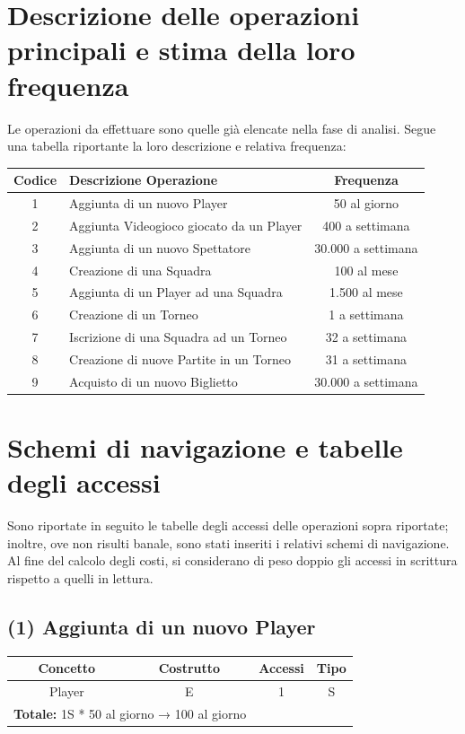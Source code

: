 \documentclass[a4paper,12pt]{report}
\begin{document}
\section{Descrizione delle operazioni principali e stima della loro frequenza}
Le operazioni da effettuare sono quelle già elencate nella fase di analisi. Segue una tabella
riportante la loro descrizione e relativa frequenza:
\begin{center}
	\begin{tabular}{|c|m{8cm}|c|}
		\hline\rowcolor{pink}
		Codice & Descrizione Operazione & Frequenza\\
		\hline\hline
		1 & Aggiunta di un nuovo Player & 50 al giorno\\ 
		\hline	
		2 & Aggiunta Videogioco giocato da un Player & 400 a settimana \\
		\hline
		3 & Aggiunta di un nuovo Spettatore & 30.000 a settimana \\
		\hline
		4 & Creazione di una Squadra & 100 al mese\\
		\hline 
		5 & Aggiunta di un Player ad una Squadra & 1.500 al mese\\ 
		\hline
		6 & Creazione di un Torneo & 1 a settimana\\ 
		\hline
		7 & Iscrizione di una Squadra ad un Torneo & 32 a settimana\\ 
		\hline
		8 & Creazione di nuove Partite in un Torneo & 31 a settimana\\ 
		\hline
		9 & Acquisto di un nuovo Biglietto & 30.000 a settimana\\ 
		\hline
	\end{tabular}
\end{center}
\section{Schemi di navigazione e tabelle degli accessi}
Sono riportate in seguito le tabelle degli accessi delle operazioni sopra riportate; inoltre, ove
non risulti banale, sono stati inseriti i relativi schemi di navigazione. Al fine del calcolo degli
costi, si considerano di peso doppio gli accessi in scrittura rispetto a quelli in lettura.
\renewcommand{\arraystretch}{1.15} %
\setlength{\arrayrulewidth}{0.5mm}%
\setlength{\tabcolsep}{10pt}%
\setlength\doublerulesep{0.1cm}%
\subsection*{(1) Aggiunta di un nuovo Player}
\begin{center}
	\begin{tabular}{|c|c|c|c|}
		\hline\rowcolor{pink}
		Concetto & Costrutto & Accessi & Tipo\\
		\hline\hline
		Player & E & 1 & S\\
		\hline\hline
		\multicolumn{2}{l}{
			\textbf{Totale:} 1S * 50 al giorno → 100 al giorno} \\
		\hline
	\end{tabular}
\end{center}
\end{document}
